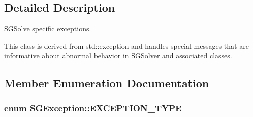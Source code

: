 \subsection{Detailed Description}
S\-G\-Solve specific exceptions. 

This class is derived from std\-::exception and handles special messages that are informative about abnormal behavior in \hyperlink{classSGSolver}{S\-G\-Solver} and associated classes. 

\subsection{Member Enumeration Documentation}
\hypertarget{classSGException_af5054226bbd734c10b3a2e6d0505a984}{
\subsubsection[{E\-X\-C\-E\-P\-T\-I\-O\-N\-\_\-\-T\-Y\-P\-E}]{\setlength{\rightskip}{0pt plus 5cm}enum {\bf S\-G\-Exception\-::\-E\-X\-C\-E\-P\-T\-I\-O\-N\-\_\-\-T\-Y\-P\-E}}}\label{classSGException_af5054226bbd734c10b3a2e6d0505a984}
